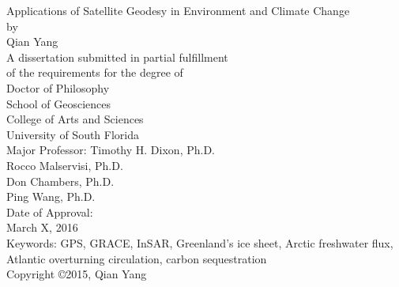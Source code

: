 \begin{titlepage}
\begin{center}
\singlespacing
{ \vspace*{\baselineskip} }
{ \vspace*{\baselineskip} }
{ \vspace*{\baselineskip} }
{ \vspace*{\baselineskip} }
Applications of Satellite Geodesy in Environment and Climate Change\\
{ \vspace*{\baselineskip} }
{ \vspace*{\baselineskip} }
{ \vspace*{\baselineskip} }
by\\
{ \vspace*{\baselineskip} }
{ \vspace*{\baselineskip} }
{ \vspace*{\baselineskip} }
Qian Yang\\
{ \vspace*{\baselineskip} }
{ \vspace*{\baselineskip} }
{ \vspace*{\baselineskip} }
{ \vspace*{\baselineskip} }
A dissertation submitted in partial fulfillment\\
of the requirements for the degree of\\
Doctor of Philosophy\\
School of Geosciences\\
College of Arts and Sciences\\
University of South Florida\\
{ \vspace*{\baselineskip} }
{ \vspace*{\baselineskip} }
{ \vspace*{\baselineskip} }
Major Professor: Timothy H. Dixon, Ph.D.\\
Rocco Malservisi, Ph.D.\\
Don Chambers, Ph.D.\\
Ping Wang, Ph.D.\\
{ \vspace*{\baselineskip} }
{ \vspace*{\baselineskip} }
Date of Approval:\\
March X, 2016\\
{ \vspace*{\baselineskip} }
{ \vspace*{\baselineskip} }
{ \vspace*{\baselineskip} }
Keywords: GPS, GRACE, InSAR, Greenland's ice sheet, Arctic freshwater flux, Atlantic overturning circulation, carbon sequestration\\
{ \vspace*{\baselineskip} }
Copyright \copyright\hspace{1mm}2015, Qian Yang\\
\end{center}
\end{titlepage}